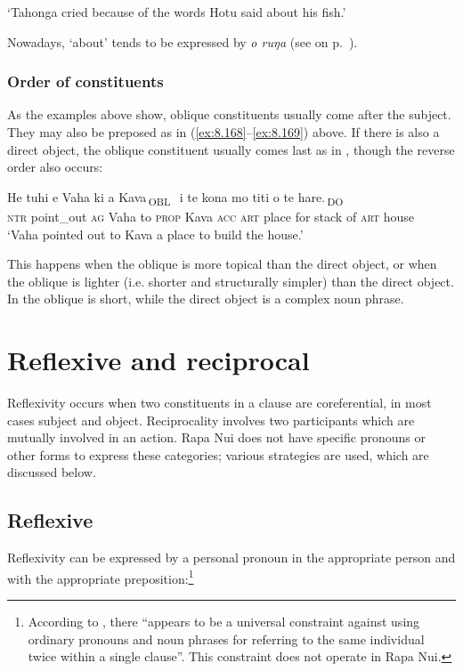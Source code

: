 \glt
‘Tahonga cried because of the words Hotu said about his fish.’ \textstyleExampleref{[R301.295]} 
\z

Nowadays, ‘about’ tends to be expressed by \textit{o ruŋa} (see  on p.~\pageref{ex:3.152}).

\subsubsection{Order of constituents}
As the examples above show, oblique constituents usually come after the subject. They may also be preposed as in (\ref{ex:8.168}–\ref{ex:8.169}) above. If there is also a direct object, the oblique constituent usually comes last as in , though the reverse order also occurs:

\ea\label{ex:8.184}
\gll He tuhi e Vaha {\ob}ki a Kava\,{\cb}\textsubscript{\textup{OBL~}} {\ob}i te kona mo titi o te hare.\,{\cb}\textsubscript{\textup{DO}}\\
\textsc{ntr} point\_out \textsc{ag} Vaha {\db}to \textsc{prop} Kava {\db}\textsc{acc} \textsc{art} place for stack of \textsc{art} house\\

\glt
‘Vaha pointed out to Kava a place to build the house.’ \textstyleExampleref{[R229.110]} 
\z

This happens when the oblique is more topical than the direct object, or when the oblique is lighter (i.e. shorter and structurally simpler) than the direct object. In  the oblique is short, while the direct object is a complex noun phrase.
\section{Reflexive and reciprocal}\label{sec:8.9}
Reflexivity occurs when two constituents in a clause are coreferential, in most cases subject and object. Reciprocality involves two participants which are mutually involved in an action. Rapa Nui does not have specific pronouns or other forms to express these categories; various strategies are used, which are discussed below.

\subsection{Reflexive}
Reflexivity can be expressed by a personal pronoun in the appropriate person and with the appropriate preposition:\footnote{\label{fn:446}According to \citet[265]{AndersonKeenan1985}, there “appears to be a universal constraint against using ordinary pronouns and noun phrases for referring to the same individual twice within a single clause”. This constraint does not operate in Rapa Nui.}

